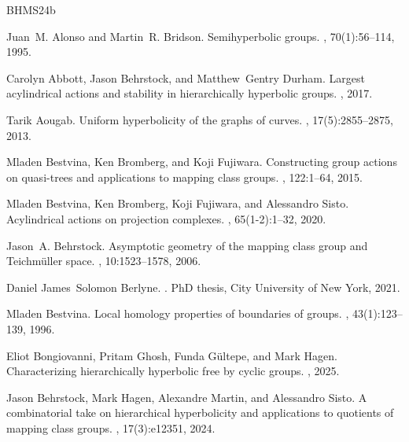 \documentclass{amsart}
\theoremstyle{definition}
\theoremstyle{remark}
\theoremstyle{definition}
\begin{document}
\begin{thebibliography}{BHMS24b}

Juan~M. Alonso and Martin~R. Bridson.
\newblock Semihyperbolic groups.
, 70(1):56--114, 1995.

Carolyn Abbott, Jason Behrstock, and Matthew~Gentry Durham.
\newblock Largest acylindrical actions and stability in hierarchically
  hyperbolic groups.
, 2017.

Tarik Aougab.
\newblock Uniform hyperbolicity of the graphs of curves.
, 17(5):2855--2875, 2013.

Mladen Bestvina, Ken Bromberg, and Koji Fujiwara.
\newblock Constructing group actions on quasi-trees and applications to mapping
  class groups.
, 122:1--64, 2015.

Mladen Bestvina, Ken Bromberg, Koji Fujiwara, and Alessandro Sisto.
\newblock Acylindrical actions on projection complexes.
, 65(1-2):1--32, 2020.

Jason~A. Behrstock.
\newblock Asymptotic geometry of the mapping class group and {T}eichm\"{u}ller
  space.
, 10:1523--1578, 2006.

Daniel James~Solomon Berlyne.
.
\newblock PhD thesis, City University of New York, 2021.

Mladen Bestvina.
\newblock Local homology properties of boundaries of groups.
, 43(1):123--139, 1996.

Eliot Bongiovanni, Pritam Ghosh, Funda G{\"u}ltepe, and Mark Hagen.
\newblock Characterizing hierarchically hyperbolic free by cyclic groups.
, 2025.

Jason Behrstock, Mark Hagen, Alexandre Martin, and Alessandro Sisto.
\newblock A combinatorial take on hierarchical hyperbolicity and applications
  to quotients of mapping class groups.
, 17(3):e12351, 2024.


\end{thebibliography}
\end{document}
